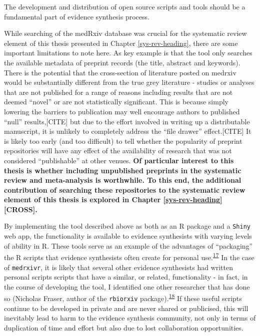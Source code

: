 \documentclass[a4paper, twoside]{templates/ociamthesis}
\begin{document}
The development and distribution of open source scripts and tools should be a fundamental part of evidence synthesis process.

While searching of the medRxiv database was crucial for the systematic review element of this thesis presented in Chapter \ref{sys-rev-heading}, there are some important limitations to note here. As key example is that the tool only searches the available metadata of preprint records (the title, abstract and keywords).
There is the potential that the cross-section of literature posted on medrxiv would be substantially different from the true grey literature - studies or analyses that are not published for a range of reasons including results that are not deemed ``novel'' or are not statistically significant.
This is because simply lowering the barriers to publication may well encourage authors to published ``null'' results,{[}CITE{]} but due to the effort involved in writing up a distributable manuscript, it is unlikely to completely address the ``file drawer'' effect.{[}CITE{]}
It is likely too early (and too difficult) to tell whether the popularity of preprint repositories will have any effect of the availability of research that was not considered ``publishable'' at other venues.
\textbf{Of particular interest to this thesis is whether including unpublished preprints in the systematic review and meta-analysis is worthwhile. To this end, the additional contribution of searching these repositories to the systematic review element of this thesis is explored in Chapter \ref{sys-rev-heading} {[}CROSS{]}.}

By implementing the tool described above as both as an R package and a \texttt{Shiny} web app, the functionality is available to evidence synthesists with varying levels of ability in R.
These tools serve as an example of the advantages of ``packaging'' the R scripts that evidence synthesists often create for personal use.\textsuperscript{\protect\hyperlink{ref-wickham2015r}{17}}
In the case of \texttt{medrxivr}, it is likely that several other evidence synthesists had written personal scripts scripts that have a similar, or related, functionality - in fact, in the course of developing the tool, I identified one other researcher that has done so (Nicholas Fraser, author of the \texttt{rbiorxiv} package).\textsuperscript{\protect\hyperlink{ref-rbiorxiv}{18}}
If these useful scripts continue to be developed in private and are never shared or publicised, this will inevitably lead to harm to the evidence synthesis community, not only in terms of duplication of time and effort but also due to lost collaboration opportunities.
\end{document}
